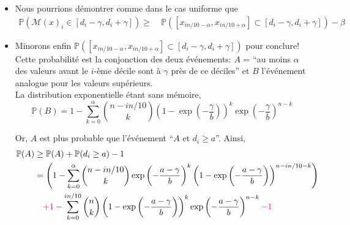 \begin{itemize}[label=•]
    \item Nous pourrions démontrer comme dans le cas uniforme que
    \begin{align*}
        \mathbb P\left(  \mathcal M(x)_i \in [d_i - \gamma, d_i + \gamma] \right) \geq &\ \mathbb P \left([x_{i n/10 -\alpha},x_{i n/10 +\alpha}] \subset [d_i - \gamma, d_i + \gamma] \right) - \beta
   \end{align*}
   \item Minorons enfin \(\mathbb P \left([x_{i n/10 -\alpha},x_{i n/10 +\alpha}] \subset [d_i - \gamma, d_i + \gamma] \right)\) pour conclure!\\
   
   Cette probabilité est la conjonction des deux événements: \(A\) = ``au moins \(\alpha\) des valeurs avant le \(i\)-ème décile sont à \(\gamma\) près de ce déciles'' et \(B\) l'événement analogue pour les valeurs supérieurs.\\

   La distribution exponentielle étant sans mémoire,
   \[
        \mathbb P (B) = 1 - \sum_{k = 0}^{\alpha} \binom{n - in/10}{k} \left( 1 - \exp\left( -\dfrac{\gamma}{b} \right) \right)^k \exp\left( -\dfrac{\gamma}{b} \right)^{n-k}
   \]

   Or, \(A\) est plus probable que l'événement ``\(A\) et \(d_i \geq a\)''. Ainsi, 
   \begin{align*}
        \mathbb P(A) & \geq \mathbb P (A) + \mathbb P(d_i \geq a) - 1\\
        & = \left( 1 - \sum_{k = 0}^{\alpha} \binom{n - in/10}{k}\exp\left( -\dfrac{a-\gamma}{b} \right)^k \left( 1 - \exp\left( -\dfrac{a-\gamma}{b} \right) \right)^{n - in/10 -k} \right)\\
        & \quad  {\color{magenta} + 1} - \sum_{k = 0}^{in/10} \binom{n}{k} \left( 1 - \exp\left( -\dfrac{a-\gamma}{b} \right) \right)^k \exp\left( -\dfrac{a-\gamma}{b} \right)^{n-k} {\color{magenta} - 1}
   \end{align*}
\end{itemize}



